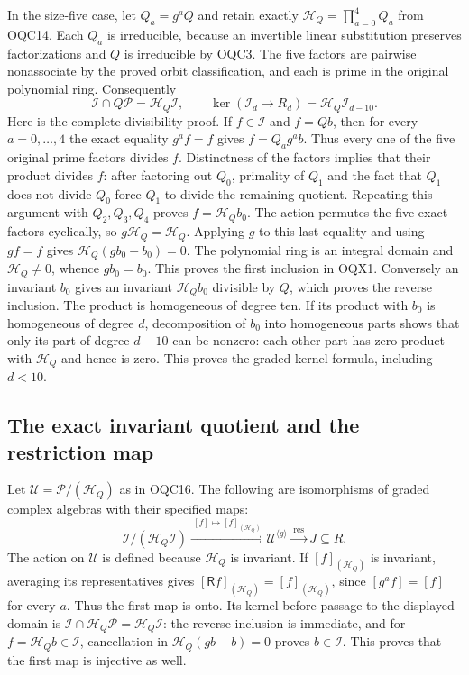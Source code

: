 \documentclass[11pt,a4paper]{article}
\begin{document}
In the size-five case, let $Q_a=g^aQ$ and retain exactly
$\mathcal H_Q=\prod_{a=0}^4Q_a$ from OQC14. Each $Q_a$ is
irreducible, because an invertible linear substitution preserves
factorizations and $Q$ is irreducible by OQC3. The five factors are
pairwise nonassociate by the proved orbit classification, and each
is prime in the original polynomial ring. Consequently
\[
 \boxed{\quad
 \mathscr I\cap Q\mathscr P=\mathcal H_Q\mathscr I,
 \qquad
 \ker(\mathscr I_d\longrightarrow R_d)
                       =\mathcal H_Q\mathscr I_{d-10}.
 \quad}\tag{OQX1}
\]
Here is the complete divisibility proof. If $f\in\mathscr I$ and
$f=Qb$, then for every $a=0,\ldots,4$ the exact equality
$g^af=f$ gives $f=Q_a g^ab$. Thus every one of the five original
prime factors divides $f$. Distinctness of the factors implies
that their product divides $f$: after factoring out $Q_0$,
primality of $Q_1$ and the fact that $Q_1$ does not divide $Q_0$
force $Q_1$ to divide the remaining quotient. Repeating this
argument with $Q_2,Q_3,Q_4$ proves
$f=\mathcal H_Q b_0$. The action permutes the five exact factors
cyclically, so $g\mathcal H_Q=\mathcal H_Q$. Applying $g$ to
this last equality and using $gf=f$ gives
$\mathcal H_Q(gb_0-b_0)=0$. The polynomial ring is an integral
domain and $\mathcal H_Q\ne0$, whence $gb_0=b_0$.
This proves the first inclusion in OQX1. Conversely an invariant
$b_0$ gives an invariant $\mathcal H_Qb_0$ divisible by $Q$,
which proves the reverse inclusion. The product is homogeneous
of degree ten. If its product with $b_0$ is homogeneous of degree
$d$, decomposition of $b_0$ into homogeneous parts shows that
only its part of degree $d-10$ can be nonzero: each other part
has zero product with $\mathcal H_Q$ and hence is zero.
This proves the graded kernel formula, including $d<10$.

\subsection{The exact invariant quotient and the restriction map}

Let $\mathscr U=\mathscr P/(\mathcal H_Q)$ as in OQC16. The
following are isomorphisms of graded complex algebras with their
specified maps:
\[
 \boxed{\quad
 \mathscr I/(\mathcal H_Q\mathscr I)
 \xrightarrow{\ [f]\mapsto[f]_{(\mathcal H_Q)}\ }
       \mathscr U^{\langle g\rangle}
 \xrightarrow{\ \operatorname{res}\ } J\subseteq R.
 \quad}\tag{OQX2}
\]
The action on $\mathscr U$ is defined because $\mathcal H_Q$ is
invariant. If $[f]_{(\mathcal H_Q)}$ is invariant, averaging its
representatives gives
$[\mathsf R f]_{(\mathcal H_Q)}=[f]_{(\mathcal H_Q)}$, since
$[g^af]=[f]$ for every $a$. Thus the first map is onto.
Its kernel before passage to the displayed domain is
$\mathscr I\cap\mathcal H_Q\mathscr P
=\mathcal H_Q\mathscr I$: the reverse inclusion is immediate,
and for $f=\mathcal H_Qb\in\mathscr I$, cancellation in
$\mathcal H_Q(gb-b)=0$ proves $b\in\mathscr I$.
This proves that the first map is injective as well.
\end{document}
